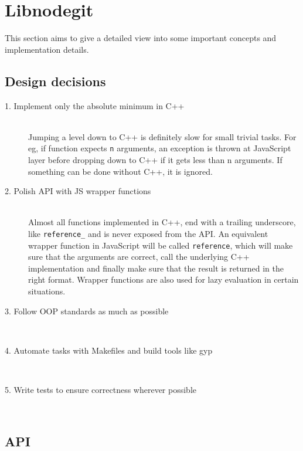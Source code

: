 \chapter{Libnodegit}

This section aims to give a detailed view into some important concepts and
implementation details.

\section{Design decisions}

\begin{description}

\item[1. Implement only the absolute minimum in C++] \hfill \\
  Jumping a level down to C++ is definitely slow for small trivial tasks. For
  eg, if function expects \texttt{n} arguments, an exception is thrown at
  JavaScript layer before dropping down to C++ if it gets less than n arguments.
  If something can be done without C++, it is ignored.

\item[2. Polish API with JS wrapper functions] \hfill \\
  Almost all functions implemented in C++, end with a trailing underscore, like
  \texttt{reference\_} and is never exposed from the API. An equivalent wrapper
  function in JavaScript will be called \texttt{reference}, which will make sure
  that the arguments are correct, call the underlying C++ implementation and
  finally make sure that the result is returned in the right format. Wrapper
  functions are also used for lazy evaluation in certain situations.

\item[3. Follow OOP standards as much as possible] \hfill \\
\item[4. Automate tasks with Makefiles and build tools like gyp] \hfill \\
\item[5. Write tests to ensure correctness wherever possible] \hfill \\

\end{description}

\section{API}

